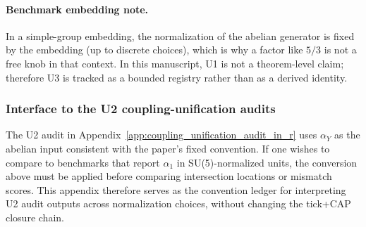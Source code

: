 \paragraph{Benchmark embedding note.}
\AuditTag In a simple-group embedding, the normalization of the abelian generator is fixed by the embedding (up to discrete choices), which is why a factor like $5/3$ is not a free knob in that context.
In this manuscript, U1 is not a theorem-level claim; therefore U3 is tracked as a bounded registry rather than as a derived identity.

\subsubsection{Interface to the U2 coupling-unification audits}
\AuditTag The U2 audit in Appendix~\ref{app:coupling_unification_audit_in_r} uses $\alpha_Y$ as the abelian input consistent with the paper's fixed convention.
If one wishes to compare to benchmarks that report $\alpha_1$ in SU(5)-normalized units, the conversion above must be applied before comparing intersection locations or mismatch scores.
This appendix therefore serves as the convention ledger for interpreting U2 audit outputs across normalization choices, without changing the tick+CAP closure chain.
